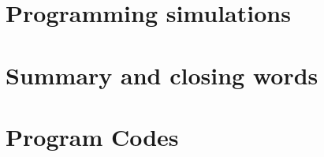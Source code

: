 \documentclass[12pt,a4paper,oneside]{book} %
\begin{document}
	\chapter{Programming simulations} %


		
	\chapter{Summary and closing words}\label{ch:closing}
	



	
	
	
	
	\appendix
	
	\chapter{Program Codes}\label{ap:codes}
	
\end{document}
